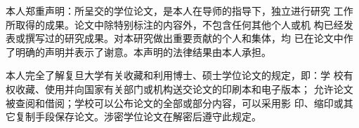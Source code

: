 
本人郑重声明：所呈交的学位论文，是本人在导师的指导下，独立进行研究
    工作所取得的成果。论文中除特别标注的内容外，不包含任何其他个人或机
    构已经发表或撰写过的研究成果。对本研究做出重要贡献的个人和集体，均
    已在论文中作了明确的声明并表示了谢意。本声明的法律结果由本人承担。

    \indentation


    本人完全了解复旦大学有关收藏和利用博士、硕士学位论文的规定，即：学
    校有权收藏、使用并向国家有关部门或机构送交论文的印刷本和电子版本；
    允许论文被查阅和借阅；学校可以公布论文的全部或部分内容，可以采用影
    印、缩印或其它复制手段保存论文。涉密学位论文在解密后遵守此规定。
    \page
